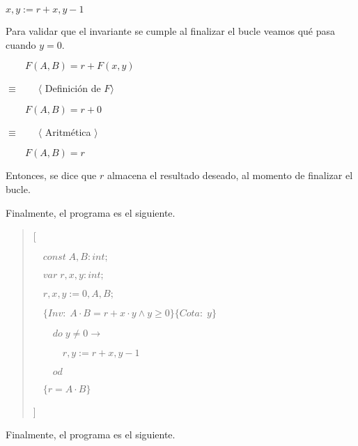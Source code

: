 \documentclass[hidelinks]{article}
\newenvironment{absolutelynopagebreak}
{\Needspace{10\baselineskip}\begin{quote}}
		{\end{quote}}
\begin{document}
\begin{enumerate}
	      \begin{center}
		      $x,y := r + x, y - 1$\par
	      \end{center}

	      Para validar que el invariante se cumple al finalizar el bucle veamos qué pasa
	      cuando $y = 0$.\par
	      $\qquad F(A,B) = r + F(x,y)$\par
	      $\equiv \qquad \langle $ Definición de $ F \rangle$\par
	      $\qquad F(A,B) = r + 0$\par
	      $\equiv \qquad \langle $ Aritmética $\rangle$\par
	      $\qquad F(A,B) = r$\par

	      Entonces, se dice que $r$ almacena el resultado deseado, al momento de
	      finalizar el bucle.\par

\end{enumerate}

Finalmente, el programa es el siguiente.\par

\begin{absolutelynopagebreak}
	[\par
		$\quad const \; A, B: int;$\par
		$\quad var \; r, x, y : int;$\par
		$\quad r, x, y := 0, A, B;$\par
		$\quad \{Inv:\; A \cdot B = r + x \cdot y \land y \geq 0\}\{Cota: \; y\}$ \par
		$\qquad do \; y \neq 0 \rightarrow$ \par
		$\qquad \quad r, y := r + x, y - 1$ \par
		$\qquad od$ \par
		$\quad \{r =A \cdot B\}$ \par
	]\par
\end{absolutelynopagebreak}\par

\newpage

Finalmente, el programa es el siguiente.\par
\end{document}

